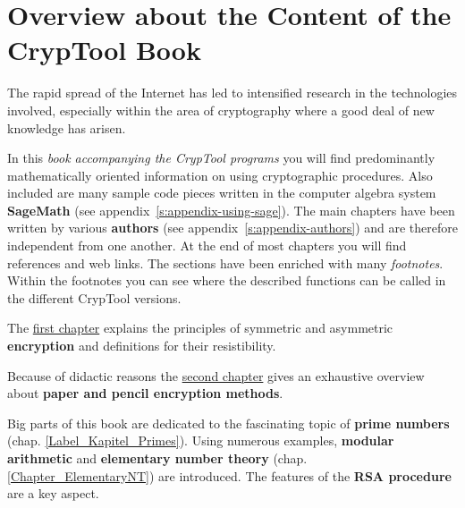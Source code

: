
\makeatletter \renewcommand{\thepage}{~\csname @roman\endcsname \c@page~} \makeatother
\clearpage{}

\chapter*{Overview about the Content of the CrypTool Book}  

\parskip 4pt
The rapid spread of the Internet has led to intensified research in the
technologies involved, especially within the area of cryptography where a good
deal of new knowledge has arisen.

In this {\em book accompanying the CrypTool programs} 
you will find predominantly mathematically oriented information on using
cryptographic procedures. Also included are many sample code pieces written in the
computer algebra system {\bf SageMath} (see appendix~\ref{s:appendix-using-sage}).
The main chapters have been written by various {\bf authors}
(see appendix~\ref{s:appendix-authors}) %
and are therefore independent from one another. At the end of most chapters
you will find references and web links.
The sections have been enriched with many {\em footnotes}. Within the footnotes
you can see where the described functions can be called in the different CrypTool
versions.

The \hyperlink{Kapitel_1}{first chapter} explains the principles of symmetric
and asymmetric {\bf encryption} and definitions for their resistibility.

Because of didactic reasons the \hyperlink{Kapitel_PaperandPencil}
{second chapter} gives an exhaustive overview
about {\bf paper and pencil encryption methods}.

Big parts of this book are dedicated to the fascinating topic of 
{\bf prime numbers} (chap. \ref{Label_Kapitel_Primes}).
Using numerous examples, {\bf modular arithmetic} and 
{\bf elementary number theory} (chap. \ref{Chapter_ElementaryNT})
are introduced. The features of the {\bf RSA procedure} are a key aspect.

